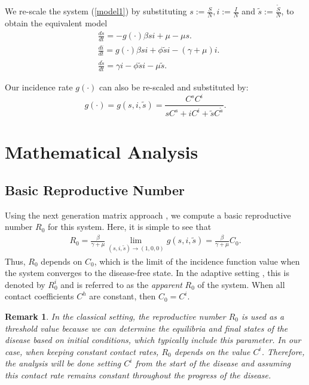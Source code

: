 \documentclass[sn-basic]{sn-jnl}%
\theoremstyle{thmstyleone}%
\theoremstyle{thmstyletwo}%
\newtheorem{remark}{Remark}%
\theoremstyle{thmstylethree}%
\newcommand{\wS}{\widetilde{S}}
\newcommand{\ws}{\widetilde{s}}
\begin{document}
We re-scale the system (\ref{model1}) by substituting $s := \frac{S}{N}, i := \frac{I}{N}$ and $\ws:= \frac{\wS}{N}$, to obtain the equivalent model
\begin{subequations}\label{model}
\begin{align}
    & \frac{ds}{dt}=  -g(\cdot)\beta si + \mu  - \mu s. \label{modeleqn1} \\
    & \frac{di}{dt}= g(\cdot)\beta si + \phi \ws i-(\gamma+\mu)i.  \label{modeleqn2}  \\
    & \frac{d\ws}{dt}= \gamma i - \phi \ws i - \mu \ws.  \label{modeleqn3} 
\end{align}
\end{subequations}

Our incidence rate $g(\cdot)$ can also be re-scaled and substituted by: $$g(\cdot) = g(s,i,\ws) = \frac{C^sC^i}{sC^s + iC^i + \ws C^{\ws}}.$$
\section{Mathematical Analysis}\label{section3}

\subsection{Basic Reproductive Number}

Using the next generation matrix approach \cite{Hethcote00}, we compute a basic reproductive number $R_0$ for this system. Here, it is simple to see that 
\begin{align*}
R_0 = \frac{\beta}{\gamma+\mu} \lim_{(s,i,\ws) \to (1,0,0)} g(s,i,\ws) = \frac{\beta}{\gamma+\mu}C_0.
\end{align*} 
Thus, $R_0$ depends on $C_0$, which is the limit of the incidence function value when the system converges to the disease-free state. In the adaptive setting \cite{Feni11}, this is denoted by $R_0^i$ and is referred to as the \textit{apparent} $R_0$ of the system. When all contact coefficients $C^h$ are constant, then $C_0=C^i$.

\begin{remark}
    In the classical setting, the reproductive number $R_0$ is used as a \textit{threshold} value because we can determine the equilibria and final states of the disease based on initial conditions, which typically include this parameter. In our case, when keeping constant contact rates, $R_0$ depends on the value $C^i$. Therefore, the analysis will be done setting $C^i$ from the start of the disease and assuming this contact rate remains constant throughout the progress of the disease.
\end{remark}
\end{document}
